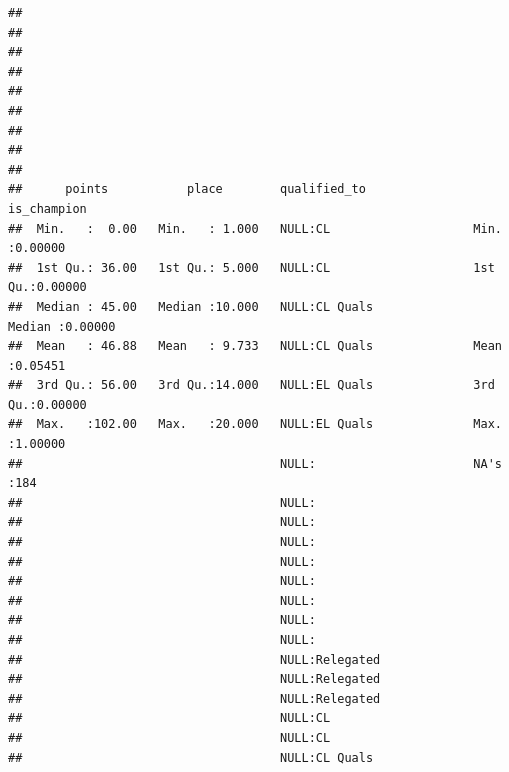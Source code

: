 \documentclass{article}\usepackage[]{graphicx}\usepackage[]{color}
\makeatletter
\newenvironment{kframe}{%
 \def\at@end@of@kframe{}%
 \ifinner\ifhmode%
  \def\at@end@of@kframe{\end{minipage}}%
  \begin{minipage}{\columnwidth}%
 \fi\fi%
 \def\FrameCommand##1{\hskip\@totalleftmargin \hskip-\fboxsep
 \colorbox{shadecolor}{##1}\hskip-\fboxsep
     \hskip-\linewidth \hskip-\@totalleftmargin \hskip\columnwidth}%
 \MakeFramed {\advance\hsize-\width
   \@totalleftmargin\z@ \linewidth\hsize
   \@setminipage}}%
 {\par\unskip\endMakeFramed%
 \at@end@of@kframe}
\newenvironment{knitrout}{}{} %
\makeatother
\begin{document}
\begin{knitrout}
\begin{kframe}
\begin{verbatim}
##                                                                                       
##                                                                                       
##                                                                                       
##                                                                                       
##                                                                                       
##                                                                                       
##                                                                                       
##                                                                                       
##                                                                                       
##      points           place        qualified_to                is_champion     
##  Min.   :  0.00   Min.   : 1.000   NULL:CL                    Min.   :0.00000  
##  1st Qu.: 36.00   1st Qu.: 5.000   NULL:CL                    1st Qu.:0.00000  
##  Median : 45.00   Median :10.000   NULL:CL Quals              Median :0.00000  
##  Mean   : 46.88   Mean   : 9.733   NULL:CL Quals              Mean   :0.05451  
##  3rd Qu.: 56.00   3rd Qu.:14.000   NULL:EL Quals              3rd Qu.:0.00000  
##  Max.   :102.00   Max.   :20.000   NULL:EL Quals              Max.   :1.00000  
##                                    NULL:                      NA's   :184      
##                                    NULL:                                       
##                                    NULL:                                       
##                                    NULL:                                       
##                                    NULL:                                       
##                                    NULL:                                       
##                                    NULL:                                       
##                                    NULL:                                       
##                                    NULL:                                       
##                                    NULL:Relegated                              
##                                    NULL:Relegated                              
##                                    NULL:Relegated                              
##                                    NULL:CL                                     
##                                    NULL:CL                                     
##                                    NULL:CL Quals                               

\end{verbatim}
\end{kframe}
\end{knitrout}
\end{document}
